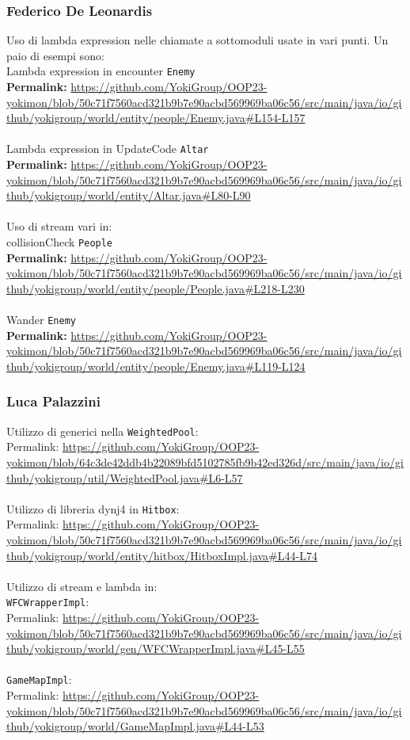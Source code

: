 \documentclass[a4paper,12pt]{report}
\begin{document}
\subsubsection{Federico De Leonardis}
Uso di lambda expression nelle chiamate a sottomoduli usate in vari punti. Un paio di esempi sono: \\
Lambda expression in encounter \texttt{Enemy} \\
\textbf{Permalink:} \url{https://github.com/YokiGroup/OOP23-yokimon/blob/50c71f7560acd321b9b7e90acbd569969ba06c56/src/main/java/io/github/yokigroup/world/entity/people/Enemy.java#L154-L157} \\
\\ 
Lambda expression in UpdateCode \texttt{Altar} \\
\textbf{Permalink:} \url{https://github.com/YokiGroup/OOP23-yokimon/blob/50c71f7560acd321b9b7e90acbd569969ba06c56/src/main/java/io/github/yokigroup/world/entity/Altar.java#L80-L90} \\
\\
Uso di stream vari in: \\
collisionCheck \texttt{People} \\
\textbf{Permalink:} \url{https://github.com/YokiGroup/OOP23-yokimon/blob/50c71f7560acd321b9b7e90acbd569969ba06c56/src/main/java/io/github/yokigroup/world/entity/people/People.java#L218-L230} \\
\\
Wander \texttt{Enemy} \\
\textbf{Permalink:} \url{https://github.com/YokiGroup/OOP23-yokimon/blob/50c71f7560acd321b9b7e90acbd569969ba06c56/src/main/java/io/github/yokigroup/world/entity/people/Enemy.java#L119-L124}
\subsubsection{Luca Palazzini}
Utilizzo di generici nella \texttt{WeightedPool}: \\
Permalink: \url{https://github.com/YokiGroup/OOP23-yokimon/blob/64c3de42ddb4b22089bfd5102785fb9b42ed326d/src/main/java/io/github/yokigroup/util/WeightedPool.java#L6-L57} \\
\\
Utilizzo di libreria dynj4 in \texttt{Hitbox}: \\
Permalink: \url{https://github.com/YokiGroup/OOP23-yokimon/blob/50c71f7560acd321b9b7e90acbd569969ba06c56/src/main/java/io/github/yokigroup/world/entity/hitbox/HitboxImpl.java#L44-L74} \\
\\
Utilizzo di stream e lambda in: \\
\texttt{WFCWrapperImpl}: \\
Permalink: \url{https://github.com/YokiGroup/OOP23-yokimon/blob/50c71f7560acd321b9b7e90acbd569969ba06c56/src/main/java/io/github/yokigroup/world/gen/WFCWrapperImpl.java#L45-L55} \\
\\
\texttt{GameMapImpl}: \\
Permalink: \url{https://github.com/YokiGroup/OOP23-yokimon/blob/50c71f7560acd321b9b7e90acbd569969ba06c56/src/main/java/io/github/yokigroup/world/GameMapImpl.java#L44-L53}
\end{document}
